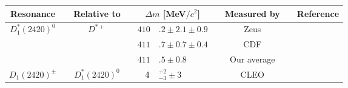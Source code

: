 {\setlength\tabcolsep{0pt}
	\begin{tabular}{cp{5pt}cp{5pt}r@{}lp{5pt}cp{5pt}c}
		\toprule
		\rowcolor{Gray}  Resonance                      &   & Relative to                                  && \multicolumn{2}{c}{$\Delta m$ [MeV$/c^{2}$]} & & \multicolumn{1}{c}{Measured by} && \multicolumn{1}{c}{Reference} 
		\\ \midrule
		\multirow{3}{*}{$D_{1}^{*}(2420)^{0}$}          &   & \multirow{3}{*}{$D^{*+}$}                    &                       & $	410$                       & $.2\pm2.1\pm0.9	$                              &                       & Zeus                          &                       & \cite{Chekanov:2008ac}  \\
		                                                &   &                                              &                       & $	411$                       & $.7\pm0.7\pm0.4	$                              &                       & CDF                           &                       & \cite{Abulencia:2005ry} \\ \cmidrule{4-9}
		                                                &   &                                              & \cellcolor{Gray}      & \cellcolor{Gray} $411$       & \cellcolor{Gray}$.5 \pm 0.8	$                  & \cellcolor{Gray}      & \cellcolor{Gray}  Our average & \cellcolor{Gray}      &                         \\ \midrule
													
		\multirow{1}{*}{$D_{1}^{}(2420)^{\pm}$}         &   & \multirow{1}{*}{$D_{1}^{*}(2420)^{0}$}       & \cellcolor{LightGray} & $	\cellcolor{LightGray}4$    & \cellcolor{LightGray}${}^{+2}_{-3}\pm3	$       & \cellcolor{LightGray} & \cellcolor{LightGray} CLEO    & \cellcolor{LightGray} & \cite{Bergfeld:1994af}  \\ \midrule
													

\end{tabular}}

